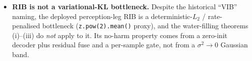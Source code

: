 \begin{itemize}
\item \textbf{RIB is not a variational-KL bottleneck.} Despite the historical
``VIB'' naming, the deployed perception-leg RIB is a deterministic-$L_2$ /
rate-penalised bottleneck (\texttt{z.pow(2).mean()} proxy), and the water-filling
theorems (i)--(iii) do \emph{not} apply to it. Its no-harm property comes from a
zero-init decoder plus residual fuse and a per-sample gate, not from a
$\sigma^2\!\to\!0$ Gaussian band.
\end{itemize}
